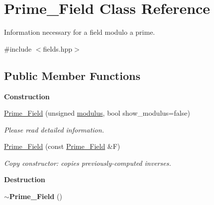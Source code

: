 \hypertarget{class_prime___field}{}\section{Prime\+\_\+\+Field Class Reference}
\label{class_prime___field}


Information necessary for a field modulo a prime.  




{\ttfamily \#include $<$fields.\+hpp$>$}

\subsection*{Public Member Functions}
\begin{Indent}\textbf{ Construction}\par
\begin{DoxyCompactItemize}
\item 
\hyperlink{class_prime___field_a22532f2a53d6c03714bfaa71e25cb06b}{Prime\+\_\+\+Field} (unsigned \hyperlink{class_prime___field_a342ee34fa19d33919f772669a637f31e}{modulus}, bool show\+\_\+modulus=false)
\begin{DoxyCompactList}\small\item\em Please read detailed information. \end{DoxyCompactList}\item 
\hyperlink{class_prime___field_a99ac17cca00c87af9ca859c8eae11006}{Prime\+\_\+\+Field} (const \hyperlink{class_prime___field}{Prime\+\_\+\+Field} \&F)
\begin{DoxyCompactList}\small\item\em Copy constructor\+: copies previously-\/computed inverses. \end{DoxyCompactList}\end{DoxyCompactItemize}
\end{Indent}
\begin{Indent}\textbf{ Destruction}\par
\begin{DoxyCompactItemize}
\item 
\mbox{\label{class_prime___field_a0865fbb0bd4478219f64098ebb1e871d}} 
{\bfseries $\sim$\+Prime\+\_\+\+Field} ()
\end{DoxyCompactItemize}
\end{Indent}
